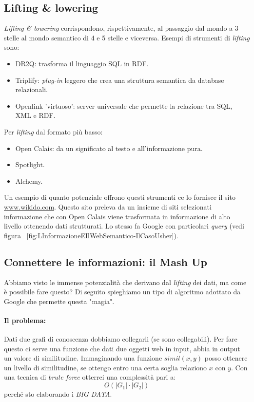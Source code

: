 		\subsection{Lifting \& lowering}
			\emph{Lifting \& lowering} corrispondono, rispettivamente, al passaggio dal mondo a 3 stelle al mondo semantico di 4 e 5 stelle e viceversa.
			Esempi di strumenti di \emph{lifting} sono:
			\begin{itemize}
				\item DR2Q: trasforma il linguaggio SQL in RDF.
				\item Triplify: \emph{plug-in} leggero che crea una struttura semantica da database relazionali.
				\item Openlink 'virtuoso': server universale che permette la relazione tra SQL, XML e RDF.
			\end{itemize}
			Per \emph{lifting} dal formato più basso:
			\begin{itemize}
				\item Open Calais: da un significato al testo e all'informazione pura.
				\item Spotlight.
				\item Alchemy.
			\end{itemize}
			Un esempio di quanto potenziale offrono questi strumenti ce lo fornisce il sito \href{http://www.wikido.com/}{www.wikido.com}. Questo sito preleva da un insieme di siti selezionati informazione che con Open Calais viene trasformata in informazione di alto livello ottenendo dati strutturati.
			Lo stesso fa Google con particolari \emph{query} (vedi figura ~\ref{fig:LInformazioneEIlWebSemantico-IlCasoUsher}).
			
		
		\subsection{Connettere le informazioni: il Mash Up}
			Abbiamo visto le immense potenzialità che derivano dal \emph{lifting} dei dati, ma come è possibile fare questo? Di seguito spieghiamo un tipo di algoritmo adottato da Google che permette questa "magia".
			
			\paragraph*{Il problema:}  Dati due grafi di conoscenza dobbiamo collegarli (se sono collegabili). Per fare questo ci serve una funzione che dati due oggetti web in input, abbia in output un valore di similitudine.
			Immaginando una funzione $simil(x,y)$ posso ottenere un livello di similitudine, se ottengo entro una certa soglia relaziono $x$ con $y$. Con una tecnica di \emph{brute force} otterrei una complessità pari a:
			\[
				O(|G_1| \cdot |G_2|) 
			\]
			perché sto elaborando i \emph{BIG DATA}.
			
